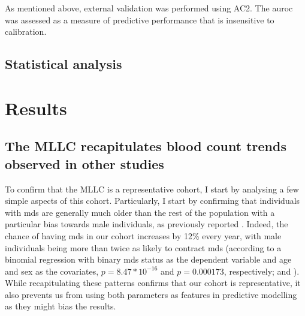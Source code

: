 As mentioned above, external validation was performed using AC2. The \ac{auroc} was assessed as a measure of predictive performance that is insensitive to calibration. 

\subsection{Statistical analysis}

\section{Results}

\subsection{The MLLC recapitulates blood count trends observed in other studies}

To confirm that the MLLC is a representative cohort, I start by analysing a few simple aspects of this cohort. Particularly, I start by confirming that individuals with \ac{mds} are generally much older than the rest of the population with a particular bias towards male individuals, as previously reported \cite{Rollison2008-yg}. Indeed, the chance of having \ac{mds} in our cohort increases by 12\% every year, with male individuals being more than twice as likely to contract \ac{mds} (according to a binomial regression with binary \ac{mds} status as the dependent variable and age and sex as the covariates, $p=8.47*10^{-16}$ and $p=0.000173$, respectively;  and ). While recapitulating these patterns confirms that our cohort is representative, it also prevents us from using both parameters as features in predictive modelling as they might bias the results.

\begin{figure}[!ht]
    \label{fig:mds-age}
\end{figure}

\begin{figure}[!ht]
    \label{fig:mds-sex}
\end{figure}

